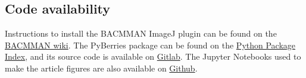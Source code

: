 \subsection*{Code availability}
Instructions to install the BACMMAN ImageJ plugin can be found on the \href{https://github.com/jeanollion/bacmman/wiki/Installation}{BACMMAN wiki}. The PyBerries package can be found on the \href{https://pypi.org/project/PyBerries/}{Python Package Index}, and its source code is available on \href{https://gitlab.com/MEKlab/pyberries}{Gitlab}. The Jupyter Notebooks used to make the article figures are also available on \href{https://github.com/DanielThedie/RecB_article}{Github}.


